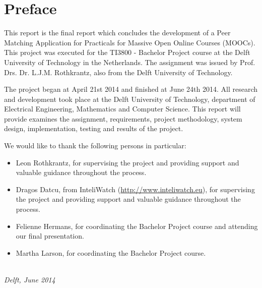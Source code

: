 \chapter*{Preface}

This report is the final report which concludes the development of a Peer Matching Application for Practicals for Massive Open Online Courses (MOOCs).
This project was executed for the TI3800 - Bachelor Project course at the Delft University of Technology in the Netherlands.
The assignment was issued by Prof. Drs. Dr. L.J.M. Rothkrantz, also from the Delft University of Technology.

The project began at April 21st 2014 and finished at June 24th 2014. All research and development took place at the Delft University of Technology, department of Electrical Engineering, Mathematics and Computer Science. This report will provide examines the assignment, requirements, project methodology, system design, implementation, testing and results of the project.

We would like to thank the following persons in particular:
\begin{itemize}
\item Leon Rothkrantz, for supervising the project and providing support and valuable guidance throughout the process.
\item Dragos Datcu, from InteliWatch (\url{http://www.inteliwatch.eu}), for supervising the project and providing support and valuable guidance throughout the process.
\item Felienne Hermans, for coordinating the Bachelor Project course and attending our final presentation.
\item Martha Larson, for coordinating the Bachelor Project course.
\end{itemize}

\begin{flushright}
{\makeatletter\itshape
    \@author \\
    Delft, June 2014
\makeatother}
\end{flushright}

